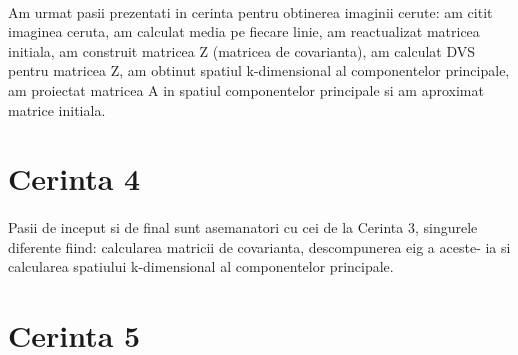 \documentclass{article}
\begin{document}
{{\paragraph{}
Am urmat pasii prezentati in cerinta pentru obtinerea imaginii cerute: am citit
imaginea ceruta, am calculat media pe fiecare linie, am reactualizat matricea
initiala, am construit matricea Z (matricea de covarianta), am calculat DVS pentru matricea Z, am obtinut
spatiul k-dimensional al componentelor principale, am proiectat matricea A in
spatiul componentelor principale si am aproximat matrice initiala.

\section{Cerinta 4}
\paragraph{}
Pasii de inceput si de final sunt asemanatori cu cei de la Cerinta 3, singurele
diferente fiind: calcularea matricii de covarianta, descompunerea eig a aceste-
ia si calcularea spatiului k-dimensional al componentelor principale.

\section{Cerinta 5}
}}
\end{document}
